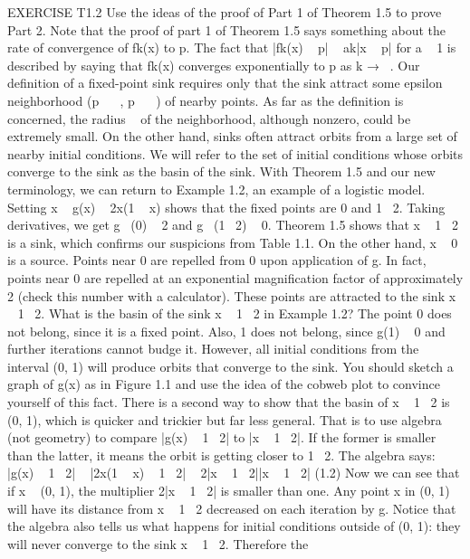\documentclass{article}
\begin{document}
EXERCISE T1.2
Use the ideas of the proof of Part 1 of Theorem 1.5 to prove Part 2.
Note that the proof of part 1 of Theorem 1.5 says something about the rate
of convergence of fk(x) to p. The fact that |fk(x)   p|   ak|x   p| for a   1 is
described by saying that fk(x) converges exponentially to p as k →  .
Our definition of a fixed-point sink requires only that the sink attract some
epsilon neighborhood (p    , p    ) of nearby points. As far as the definition
is concerned, the radius   of the neighborhood, although nonzero, could be
extremely small. On the other hand, sinks often attract orbits from a large set
of nearby initial conditions. We will refer to the set of initial conditions whose
orbits converge to the sink as the basin of the sink.
With Theorem 1.5 and our new terminology, we can return to Example
1.2, an example of a logistic model. Setting x   g(x)   2x(1   x) shows that the
fixed points are 0 and 1  2. Taking derivatives, we get g  (0)   2 and g  (1  2)   0.
Theorem 1.5 shows that x   1  2 is a sink, which confirms our suspicions from
Table 1.1. On the other hand, x   0 is a source. Points near 0 are repelled from
0 upon application of g. In fact, points near 0 are repelled at an exponential
magnification factor of approximately 2 (check this number with a calculator).
These points are attracted to the sink x   1  2.
What is the basin of the sink x   1  2 in Example 1.2? The point 0 does
not belong, since it is a fixed point. Also, 1 does not belong, since g(1)   0
and further iterations cannot budge it. However, all initial conditions from the
interval (0, 1) will produce orbits that converge to the sink. You should sketch
a graph of g(x) as in Figure 1.1 and use the idea of the cobweb plot to convince
yourself of this fact.
There is a second way to show that the basin of x   1  2 is (0, 1), which
is quicker and trickier but far less general. That is to use algebra (not geometry)
to compare |g(x)   1  2| to |x   1  2|. If the former is smaller than the latter, it
means the orbit is getting closer to 1  2. The algebra says:
|g(x)   1  2|   |2x(1   x)   1  2|
  2|x   1  2||x   1  2| (1.2)
Now we can see that if x   (0, 1), the multiplier 2|x   1  2| is smaller than one.
Any point x in (0, 1) will have its distance from x   1  2 decreased on each iteration
by g. Notice that the algebra also tells us what happens for initial conditions
outside of (0, 1): they will never converge to the sink x   1  2. Therefore the
\end{document}
